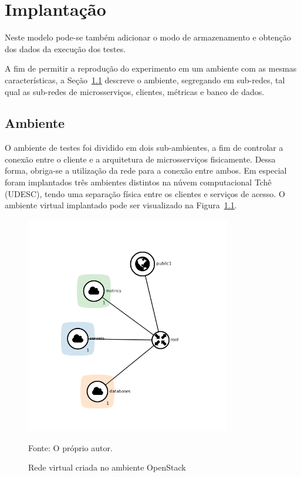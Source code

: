 \chapter{Implantação}
\label{cap6}


%
Neste modelo pode-se também adicionar o modo de armazenamento e obtenção dos dados da execução dos testes.

A fim de permitir a reprodução do experimento em um ambiente com as mesmas características, a Seção~\ref{sec:ambiente} descreve o ambiente, segregando em sub-redes, tal qual as sub-redes de microsserviços, clientes, métricas e banco de dados.


\section{Ambiente}
\label{sec:ambiente}

O ambiente de testes foi dividido em dois sub-ambientes, a fim de controlar a conexão entre o cliente e a arquitetura de microsserviços fisicamente.
%
Dessa forma, obriga-se a utilização da rede para a conexão entre ambos.
%
Em especial foram implantados três ambientes distintos na núvem computacional Tchê (UDESC), tendo uma separação física entre os clientes e serviços de acesso.
%
O ambiente virtual implantado pode ser visualizado na Figura~\ref{fig:network_open_stack}.

\begin{figure}[htb!]
  \caption{Rede virtual criada no ambiente OpenStack}
  \label{fig:network_open_stack}
  \includegraphics[width=0.8\textwidth]{figuras/network/circles_only_networks.png}
  \centering

  Fonte: O próprio autor.
\end{figure}

